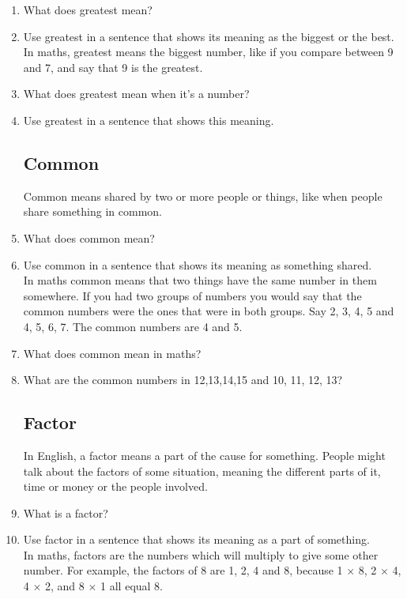 \documentclass[14pt]{article}
\begin{document}
\begin{enumerate}
\item What does greatest mean?
\item Use greatest in a sentence that shows its meaning as the biggest or the best.\\

In maths, greatest means the biggest number, like if you compare between 9 and 7, and say that 9 is the greatest.\\

\item What does greatest mean when it's a number?
\item Use greatest in a sentence that shows this meaning.

\subsection*{Common} Common means shared by two or more people or things, like when people share something in common.

\item What does common mean?
\item Use common in a sentence that shows its meaning as something shared.\\

In maths common means that two things have the same number in them somewhere. If you had two groups of numbers you would say that the common numbers were the ones that were in both groups. Say 2, 3, 4, 5 and 4, 5, 6, 7. The common numbers are 4 and 5.

\item What does common mean in maths?
\item What are the common numbers in 12,13,14,15 and 10, 11, 12, 13?

\subsection*{Factor} In English, a factor means a part of the cause for something. People might talk about the factors of some situation, meaning the different parts of it, time or money or the people involved.

\item What is a factor?
\item Use factor in a sentence that shows its meaning as a part of something.\\

In maths, factors are the numbers which will multiply to give some other number. For example, the factors of 8 are 1, 2, 4 and 8, because 1 $\times$ 8, 2 $\times$ 4, 4 $\times$ 2, and 8 $\times$ 1 all equal 8.


\end{enumerate}
\end{document}
